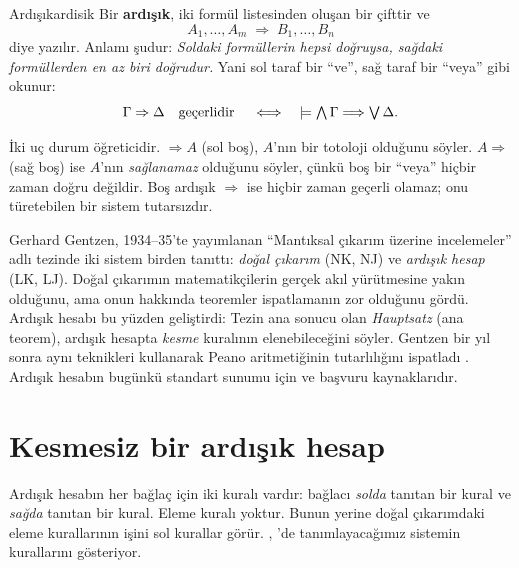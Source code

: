 \begin{tanim}{Ardışık}{ardisik}
Bir \textbf{ardışık}, iki formül listesinden oluşan bir çifttir ve
\[
  A_1, \dots, A_m \;\Rightarrow\; B_1, \dots, B_n
\]
diye yazılır. Anlamı şudur: \emph{Soldaki formüllerin hepsi doğruysa,
sağdaki formüllerden en az biri doğrudur.} Yani sol taraf bir ``ve'', sağ
taraf bir ``veya'' gibi okunur:
\[
  \Gamma \Rightarrow \Delta
  \quad\text{geçerlidir}\quad\iff\quad
  \models \textstyle\bigwedge\Gamma \Longrightarrow \bigvee\Delta .
\]
\end{tanim}

\noindent İki uç durum öğreticidir. $\Rightarrow A$ (sol boş), $A$'nın bir
totoloji olduğunu söyler. $A \Rightarrow$ (sağ boş) ise $A$'nın
\emph{sağlanamaz} olduğunu söyler, çünkü boş bir ``veya'' hiçbir zaman
doğru değildir. Boş ardışık $\Rightarrow$ ise hiçbir zaman geçerli
olamaz; onu türetebilen bir sistem tutarsızdır.

\begin{tarihce}
Gerhard Gentzen, 1934--35'te yayımlanan ``Mantıksal çıkarım üzerine
incelemeler'' adlı tezinde \citep{gentzen1935} iki sistem birden tanıttı:
\emph{doğal çıkarım} (NK, NJ) ve \emph{ardışık hesap} (LK, LJ). Doğal
çıkarımın matematikçilerin gerçek akıl yürütmesine yakın olduğunu, ama
onun hakkında teoremler ispatlamanın zor olduğunu gördü. Ardışık hesabı bu
yüzden geliştirdi: Tezin ana sonucu olan \emph{Hauptsatz} (ana teorem),
ardışık hesapta \emph{kesme} kuralının elenebileceğini söyler. Gentzen bir
yıl sonra aynı teknikleri kullanarak Peano aritmetiğinin tutarlılığını
ispatladı \citep{gentzen1936}. Ardışık hesabın bugünkü standart sunumu
için \citet{troelstra2000} ve \citet{negri2001} başvuru kaynaklarıdır.
\end{tarihce}

\section{Kesmesiz bir ardışık hesap}\label{sec:g3}

Ardışık hesabın her bağlaç için iki kuralı vardır: bağlacı \emph{solda}
tanıtan bir kural ve \emph{sağda} tanıtan bir kural. Eleme kuralı yoktur.
Bunun yerine doğal çıkarımdaki eleme kurallarının işini sol kurallar
görür. , \Lean{}'de tanımlayacağımız sistemin
kurallarını gösteriyor.

